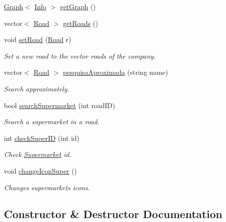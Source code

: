 \begin{DoxyCompactItemize}
\hyperlink{class_graph}{Graph}$<$ \hyperlink{class_info}{Info} $>$ \hyperlink{class_company_aa54486b77c4b2bd8ca101bc8a2795e81}{get\+Graph} ()
\item 
vector$<$ \hyperlink{class_road}{Road} $>$ \hyperlink{class_company_ac6513a2b52e71b72d6325e2c4ab79c43}{get\+Roads} ()
\item 
void \hyperlink{class_company_a16143da40ff033ea6122358b75f488c2}{set\+Road} (\hyperlink{class_road}{Road} r)
\begin{DoxyCompactList}\small\item\em Set a new road to the vector roads of the company. \end{DoxyCompactList}\item 
vector$<$ \hyperlink{class_road}{Road} $>$ \hyperlink{class_company_adec1bb75aae59543cd1ad3186b67d960}{pesquisa\+Aproximada} (string name)
\begin{DoxyCompactList}\small\item\em Search approximately. \end{DoxyCompactList}\item 
bool \hyperlink{class_company_a64b1ee56a796ebd5bb3e2c3bf0e1d9b1}{search\+Supermarket} (int road\+ID)
\begin{DoxyCompactList}\small\item\em Search a supermarket in a road. \end{DoxyCompactList}\item 
int \hyperlink{class_company_ac0f6d8bd213be6f0ac7fd778a1612fe9}{check\+Super\+ID} (int id)
\begin{DoxyCompactList}\small\item\em Check \hyperlink{class_supermarket}{Supermarket} id. \end{DoxyCompactList}\item 
\mbox{\label{class_company_acf1223dcb15cb1e36bc6c09a8cb781e3}} 
void \hyperlink{class_company_acf1223dcb15cb1e36bc6c09a8cb781e3}{change\+Icon\+Super} ()
\begin{DoxyCompactList}\small\item\em Changes supermarkets icons. \end{DoxyCompactList}\end{DoxyCompactItemize}


\subsection{Constructor \& Destructor Documentation}
\mbox{\label{class_company_a29937dda711b09df306ae7ca9b3d6b42}} 
